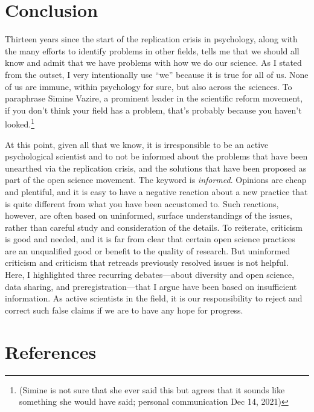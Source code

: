 \documentclass[authordate, empirical,issue]{jote-new-article}
\begin{document}
\section{Conclusion}







Thirteen years since the start of the replication crisis in psychology, along with the many efforts to identify problems in other fields, tells me that we should all know and admit that we have problems with how we do our science. As I stated from the outset, I very intentionally use “we” because it is true for all of us. None of us are immune, within psychology for sure, but also across the sciences. To paraphrase Simine Vazire, a prominent leader in the scientific reform movement, if you don't think your field has a problem, that's probably because you haven't looked.\footnote{(Simine is not sure that she ever said this but agrees that it sounds like something she would have said; personal communication Dec 14, 2021)}







At this point, given all that we know, it is irresponsible to be an active psychological scientist and to not be informed about the problems that have been unearthed via the replication crisis, and the solutions that have been proposed as part of the open science movement. The keyword is \emph{informed}. Opinions are cheap and plentiful, and it is easy to have a negative reaction about a new practice that is quite different from what you have been accustomed to. Such reactions, however, are often based on uninformed, surface understandings of the issues, rather than careful study and consideration of the details. To reiterate, criticism is good and needed, and it is far from clear that certain open science practices are an unqualified good or benefit to the quality of research. But uninformed criticism and criticism that retreads previously resolved issues is not helpful. Here, I highlighted three recurring debates—about diversity and open science, data sharing, and preregistration—that I argue have been based on insufficient information. As active scientists in the field, it is our responsibility to reject and correct such false claims if we are to have any hope for progress.

\section{References}
\end{document}
